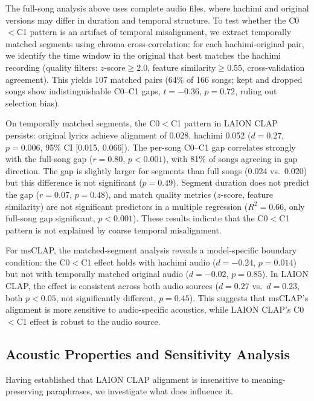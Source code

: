 \documentclass[11pt]{article}
\begin{document}
The full-song analysis above uses complete audio files, where hachimi and original versions may differ in duration and temporal structure. To test whether the C0${<}$C1 pattern is an artifact of temporal misalignment, we extract temporally matched segments using chroma cross-correlation: for each hachimi-original pair, we identify the time window in the original that best matches the hachimi recording (quality filters: $z$-score${\geq}2.0$, feature similarity${\geq}0.55$, cross-validation agreement). This yields 107 matched pairs (64\% of 166 songs; kept and dropped songs show indistinguishable C0--C1 gaps, $t{=}{-}0.36$, $p{=}0.72$, ruling out selection bias).

On temporally matched segments, the C0${<}$C1 pattern in LAION CLAP persists: original lyrics achieve alignment of 0.028, hachimi 0.052 ($d{=}0.27$, $p{=}0.006$, 95\% CI [0.015, 0.066]). The per-song C0--C1 gap correlates strongly with the full-song gap ($r{=}0.80$, $p{<}0.001$), with 81\% of songs agreeing in gap direction. The gap is slightly larger for segments than full songs (0.024 vs.\ 0.020) but this difference is not significant ($p{=}0.49$). Segment duration does not predict the gap ($r{=}0.07$, $p{=}0.48$), and match quality metrics ($z$-score, feature similarity) are not significant predictors in a multiple regression ($R^{2}{=}0.66$, only full-song gap significant, $p{<}0.001$). These results indicate that the C0${<}$C1 pattern is not explained by coarse temporal misalignment.

For msCLAP, the matched-segment analysis reveals a model-specific boundary condition: the C0${<}$C1 effect holds with hachimi audio ($d{=}{-}0.24$, $p{=}0.014$) but not with temporally matched original audio ($d{=}{-}0.02$, $p{=}0.85$). In LAION CLAP, the effect is consistent across both audio sources ($d{=}0.27$ vs.\ $d{=}0.23$, both $p{<}0.05$, not significantly different, $p{=}0.45$). This suggests that msCLAP's alignment is more sensitive to audio-specific acoustics, while LAION CLAP's C0${<}$C1 effect is robust to the audio source.

\subsection{Acoustic Properties and Sensitivity Analysis}\label{sec:acoustic}

Having established that LAION CLAP alignment is insensitive to meaning-preserving paraphrases, we investigate what does influence it.
\end{document}
